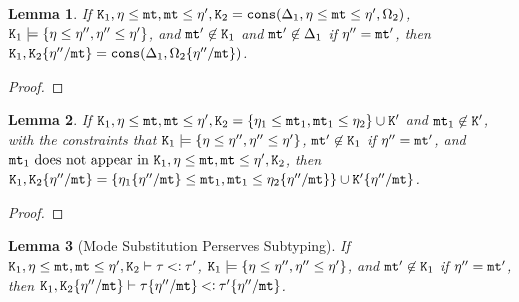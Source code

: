 \documentclass[onecolumn,nocopyrightspace]{sigplanconf}
\newtheorem{lemma}{Lemma}
\theoremstyle{lessintrusive}
\theoremstyle{plain}
\theoremstyle{custom}
\begin{document}
\begin{lemma}
\label{pf:modesubstitution-preserves-cons}
If $\mathtt{K}_{1},\eta\leq\mathtt{mt},\mathtt{mt}\leq\eta',\mathtt{K}_{2} = \mathtt{cons}(\Delta_{1},\eta\leq\mathtt{mt}\leq\eta',\Omega_{2})$, $\mathtt{K}_{1}\models\{\eta\leq\eta'',\eta''\leq\eta'\}$, and $\mathtt{mt}' \not\in \mathtt{K}_{1}$ and $\mathtt{mt}' \not\in \Delta_{1}$ if $\eta'' = \mathtt{mt}'$, then $\mathtt{K}_{1},\mathtt{K}_{2}\{\eta''/\mathtt{mt}\} = \mathtt{cons}(\Delta_{1},\Omega_{2}\{\eta''/\mathtt{mt}\})$.
\end{lemma}

\begin{proof}
\end{proof}

\begin{lemma}
\label{pf:modesubstitution-preserves-existential-constraint-equals}
If $\mathtt{K}_{1},\eta\leq\mathtt{mt},\mathtt{mt}\leq\eta',\mathtt{K}_{2} = \{\eta_{1}\leq\mathtt{mt}_{1},\mathtt{mt}_{1}\leq\eta_{2}\}\cup\mathtt{K}'$ and $\mathtt{mt}_{1} \not\in \mathtt{K}'$, with the constraints that $\mathtt{K}_{1}\models\{\eta\leq\eta'',\eta''\leq\eta'\}$, $\mathtt{mt}' \not\in \mathtt{K}_{1}$ if $\eta'' = \mathtt{mt}'$, and $\mtvar_{1}\ \textrm{does not appear in}\ \cset_{1},\basemode\msub\mtvar,\mtvar\msub\basemode',\cset_{2}$, then $\mathtt{K}_{1},\mathtt{K}_{2}\{\eta''/\mathtt{mt}\} = \{\eta_{1}\{\eta''/\mathtt{mt}\}\leq\mathtt{mt}_{1},\mathtt{mt}_{1}\leq\eta_{2}\{\eta''/\mathtt{mt}\}\}\cup\mathtt{K}'\{\eta''/\mathtt{mt}\}$.
\end{lemma}

\begin{proof}
\end{proof}

\begin{lemma}[Mode Substitution Perserves Subtyping]
\label{pf:modesubstitution-preserves-subtyping}
If $\mathtt{K}_{1},\eta\leq\mathtt{mt},\mathtt{mt}\leq\eta',\mathtt{K}_{2}\vdash\tau\mathbin{<\vcentcolon}\tau'$, $\mathtt{K}_{1}\models\{\eta\leq\eta'',\eta''\leq\eta'\}$, and $\mathtt{mt}' \not\in \mathtt{K}_{1}$ if $\eta'' = \mathtt{mt}'$, then $\mathtt{K}_{1},\mathtt{K}_{2}\{\eta''/\mathtt{mt}\}\vdash\tau\{\eta''/\mathtt{mt}\}\mathbin{<\vcentcolon}\tau'\{\eta''/\mathtt{mt}\}$.
\end{lemma}
\end{document}
